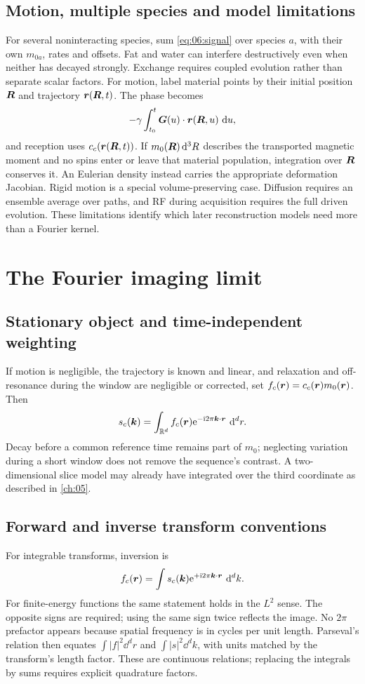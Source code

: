 \subsection{Motion, multiple species and model limitations}
For several noninteracting species, sum \cref{eq:06:signal} over species \(a\), with their own \(m_{0a}\), rates and offsets. Fat and water can interfere destructively even when neither has decayed strongly. Exchange requires coupled evolution rather than separate scalar factors.
For motion, label material points by their initial position \(\bm{R}\) and trajectory \(\bm{r}(\bm{R},t)\). The phase becomes
\[
 -\gamma\int_{t_0}^t\bm{G}(u)\cdot\bm{r}(\bm{R},u)\,\mathop{}\!\mathrm{d} u,
\]
and reception uses \(c_c(\bm{r}(\bm{R},t))\). If \(m_0(\bm{R})\mathop{}\!\mathrm{d}^3R\) describes the transported magnetic moment and no spins enter or leave that material population, integration over \(\bm{R}\) conserves it. An Eulerian density instead carries the appropriate deformation Jacobian. Rigid motion is a special volume-preserving case. Diffusion requires an ensemble average over paths, and RF during acquisition requires the full driven evolution. These limitations identify which later reconstruction models need more than a Fourier kernel.

\section{The Fourier imaging limit}
\label{sec:06:the-fourier-imaging-limit}
\subsection{Stationary object and time-independent weighting}
If motion is negligible, the trajectory is known and linear, and relaxation and off-resonance during the window are negligible or corrected, set \(f_c(\bm{r})=c_c(\bm{r})m_0(\bm{r})\). Then
\begin{equation}
 s_c(\bm{k})=\int_{\mathbb R^d}f_c(\bm{r})
             \mathrm{e}^{-\mathrm{i}2\pi\bm{k}\cdot\bm{r}}\,\mathop{}\!\mathrm{d}^dr.
 \label{eq:06:fourier}
\end{equation}
Decay before a common reference time remains part of \(m_0\); neglecting variation during a short window does not remove the sequence's contrast. A two-dimensional slice model may already have integrated over the third coordinate as described in \cref{ch:05}.

\subsection{Forward and inverse transform conventions}
For integrable transforms, inversion is
\[
 f_c(\bm{r})=\int s_c(\bm{k})\mathrm{e}^{+\mathrm{i}2\pi\bm{k}\cdot\bm{r}}\,\mathop{}\!\mathrm{d}^dk.
\]
For finite-energy functions the same statement holds in the \(L^2\) sense. The opposite signs are required; using the same sign twice reflects the image. No \(2\pi\) prefactor appears because spatial frequency is in cycles per unit length. Parseval's relation then equates
\(\int|f|^2\dd^dr\) and \(\int|s|^2\dd^dk\), with units matched by the transform's length factor. These are continuous relations; replacing the integrals by sums requires explicit quadrature factors.

